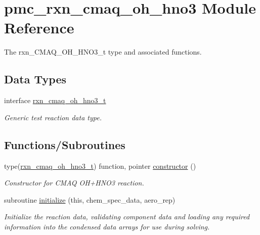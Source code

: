 \hypertarget{namespacepmc__rxn__cmaq__oh__hno3}{}\section{pmc\+\_\+rxn\+\_\+cmaq\+\_\+oh\+\_\+hno3 Module Reference}
\label{namespacepmc__rxn__cmaq__oh__hno3}


The rxn\+\_\+\+C\+M\+A\+Q\+\_\+\+O\+H\+\_\+\+H\+N\+O3\+\_\+t type and associated functions.  


\subsection*{Data Types}
\begin{DoxyCompactItemize}
\item 
interface \mbox{\hyperlink{structpmc__rxn__cmaq__oh__hno3_1_1rxn__cmaq__oh__hno3__t}{rxn\+\_\+cmaq\+\_\+oh\+\_\+hno3\+\_\+t}}
\begin{DoxyCompactList}\small\item\em Generic test reaction data type. \end{DoxyCompactList}\end{DoxyCompactItemize}
\subsection*{Functions/\+Subroutines}
\begin{DoxyCompactItemize}
\item 
type(\mbox{\hyperlink{structpmc__rxn__cmaq__oh__hno3_1_1rxn__cmaq__oh__hno3__t}{rxn\+\_\+cmaq\+\_\+oh\+\_\+hno3\+\_\+t}}) function, pointer \mbox{\hyperlink{namespacepmc__rxn__cmaq__oh__hno3_ac46f8091219be3c798ab6b7fb46aa2df}{constructor}} ()
\begin{DoxyCompactList}\small\item\em Constructor for C\+M\+AQ O\+H+\+H\+N\+O3 reaction. \end{DoxyCompactList}\item 
subroutine \mbox{\hyperlink{namespacepmc__rxn__cmaq__oh__hno3_aa017d117b8160d6df85e72882a738e69}{initialize}} (this, chem\+\_\+spec\+\_\+data, aero\+\_\+rep)
\begin{DoxyCompactList}\small\item\em Initialize the reaction data, validating component data and loading any required information into the condensed data arrays for use during solving. \end{DoxyCompactList}\end{DoxyCompactItemize}


